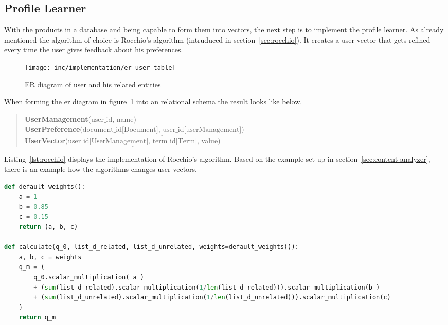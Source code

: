 
\subsection{Profile Learner}
With the products in a database and being capable to form them into vectors, the next step is to implement the profile learner.
As already mentioned the algorithm of choice is Rocchio's algorithm (intruduced in section~\ref{sec:rocchio}).
It creates a user vector that gets refined every time the user gives feedback about his preferences.


\begin{figure}[h]
    \center
    \texttt{[image: inc/implementation/er\_user\_table]}
    \caption{ER diagram of user and his related entities}
    \label{fig:er_user_table}
\end{figure}

\noindent
When forming the er diagram in figure~\ref{fig:er_user_table} into an relational schema the result looks like below.
\begin{quote}
    \textbf{UserManagement}($\underline{\text{user\_id}}$, name)\\
    \textbf{UserPreference}($\underline{\text{document\_id[Document], user\_id[userManagement]}}$)\\
    \textbf{UserVector}($\underline{\text{user\_id[UserManagement], term\_id[Term]}}$, value)\\
\end{quote}

Listing~\ref{lst:rocchio} displays the implementation of Rocchio's algorithm.
Based on the example set up in section~\ref{sec:content-analyzer}, there is an example how the algorithms changes user vectors.

\begin{lstlisting}[language=Python,caption={Implementation of Rocchio's algorithm},label={lst:rocchio}]
def default_weights():
    a = 1
    b = 0.85
    c = 0.15
    return (a, b, c)

def calculate(q_0, list_d_related, list_d_unrelated, weights=default_weights()):
    a, b, c = weights
    q_m = (
        q_0.scalar_multiplication( a )
        + (sum(list_d_related).scalar_multiplication(1/len(list_d_related))).scalar_multiplication(b )
        + (sum(list_d_unrelated).scalar_multiplication(1/len(list_d_unrelated))).scalar_multiplication(c)
    )
    return q_m
\end{lstlisting}

\begin{table}
    \begin{tabular}{ l | l }
    \end{tabular}
\end{table}





